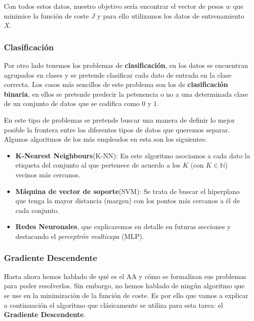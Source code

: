             \noindent Con todos estos datos, nuestro objetivo sería encontrar el vector de pesos $w$ que minimice la función de coste $J$ y para ello utilizamos los datos de entrenamiento $X$.     
            
            
        \subsubsection{Clasificación}
            \noindent Por otro lado tenemos los problemas de \textbf{clasificación}, en los datos se encuentran agrupados en clases y se pretende clasificar cada dato de entrada en la clase correcta. Los casos más sencillos de este problema son los de \textbf{clasificación binaria}, en ellos se pretende predecir la petenencia o no a una determinada clase de un conjunto de datos que se codifica como $0$ y $1$. 

            \medskip

            \noindent En este tipo de problemas se pretende buscar una manera de definir lo mejor posible la frontera entre los diferentes tipos de datos que queremos separar. Algunos algoritmos de los más empleados en esta son los siguientes: 

             \begin{itemize}
                \item \textbf{K-Nearest Neighbours}(K-NN): En este algoritmo asociamos a cada dato la etiqueta del conjunto al que pertenece de acuerdo a los $K$ (con $K \in \mathbb{N}$) vecinos más cercanos.
                \item \textbf{Máquina de vector de soporte}(SVM): Se trata de buscar el hiperplano que tenga la mayor distancia (margen) con los pontos más cercanos a él de cada conjunto.
                \item \textbf{Redes Neuronales}, que explicaremos en detalle en futuras secciones y destacando el \textit{perceptrón multicapa} (MLP).
             \end{itemize}


        \subsubsection{Gradiente Descendente}
            \noindent Hasta ahora hemos hablado de qué es el AA y cómo se formalizan sus problemas para poder resolverlos. Sin embargo, no hemos hablado de ningún algoritmo que se use en la minimización de la función de coste. Es por ello que vamos a explicar a continuación el algoritmo que clásicamente se utiliza para esta tarea: el \textbf{Gradiente Descendente}. 
    
